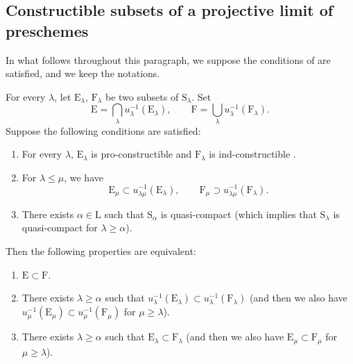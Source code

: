 \subsection{Constructible subsets of a projective limit of preschemes}
\label{subsection:IV.8.3}

\begin{env}[8.3.1]
\label{IV.8.3.1}
In what follows throughout this paragraph, we suppose the conditions of  are satisfied, and we keep the notations.
\end{env}

\begin{theorem}[8.3.2]
\label{IV.8.3.2}
For every $\lambda$, let $\mathrm{E}_\lambda$, $\mathrm{F}_\lambda$ be two subsets of $\mathrm{S}_\lambda$.
Set
\begin{equation}
  \mathrm{E}=\bigcap_\lambda u_\lambda^{-1}(\mathrm{E}_\lambda),\qquad \mathrm{F}=\bigcup_\lambda u_\lambda^{-1}(\mathrm{F}_\lambda).
  \tag{8.3.2.1}
\end{equation}
Suppose the following conditions are satisfied:
\begin{enumerate}[label=(\roman*)]
  \item For every $\lambda$, $\mathrm{E}_\lambda$ is pro-constructible and $\mathrm{F}_\lambda$ is ind-constructible .
  \item For $\lambda\leqslant\mu$, we have
  \[
    \mathrm{E}_\mu\subset u_{\lambda\mu}^{-1}(\mathrm{E}_\lambda),\qquad \mathrm{F}_\mu\supset u_{\lambda\mu}^{-1}(\mathrm{F}_\lambda).
  \]
  \item There exists $\alpha\in\mathrm{L}$ such that $\mathrm{S}_\alpha$ is quasi-compact (which implies that $\mathrm{S}_\lambda$ is quasi-compact for $\lambda\geqslant\alpha$).
\end{enumerate}
Then the following properties are equivalent:
\begin{enumerate}[label=\emph{\alph*)}]
  \item $\mathrm{E}\subset\mathrm{F}$.
  \item There exists $\lambda\geqslant\alpha$ such that $u_\lambda^{-1}(\mathrm{E}_\lambda)\subset u_\lambda^{-1}(\mathrm{F}_\lambda)$ (and then we also have $u_\mu^{-1}(\mathrm{E}_\mu)\subset u_\mu^{-1}(\mathrm{F}_\mu)$ for
$\mu\geqslant\lambda$).
  \item There exists $\lambda\geqslant\alpha$ such that $\mathrm{E}_\lambda\subset\mathrm{F}_\lambda$ (and then we also have $\mathrm{E}_\mu\subset\mathrm{F}_\mu$ for $\mu\geqslant\lambda$).
\end{enumerate}

\end{theorem}
